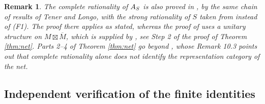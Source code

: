 \documentclass[leqno]{article}
\let\cal\relax
\newcommand{\cal}{\mathcal}
\newcommand{\ovl}{\overline}
\newtheorem{remark}[thm]{Remark}
\numberwithin{equation}{section}
\begin{document}
\begin{remark}\normalfont
\label{rem:net-DJX}
The complete rationality of $\cal A_S$ is also proved in \cite[Theorem 10.1]{DJX26}, by the same chain of results of Tener and Longo, with the strong rationality of $S$ taken from \cite[Corollary 8.2]{DJX26} instead of (F1). The proof there applies \cite[Corollary 4.24]{Ten24} as stated, whereas the proof of \cite[Corollary 4.24]{Ten24} uses a unitary structure on $M \boxtimes \ovl M$, which is supplied by \cite[Proposition 5.2]{ArhII}, see Step 2 of the proof of Theorem \ref{thm:net}. Parts 2--4 of Theorem \ref{thm:net} go beyond \cite{DJX26}, whose Remark 10.3 points out that complete rationality alone does not identify the representation category of the net.
\end{remark}


\subsection{Independent verification of the finite identities}
\label{subsec:DJX-verification}
\end{document}
